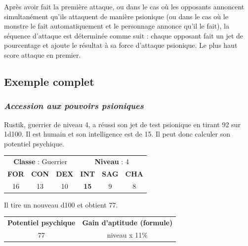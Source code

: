 \documentclass[11pt]{article}
\begin{document}
{\medskip

Après avoir fait la première attaque, ou dans le cas où les opposants annoncent simultanément qu'ils attaquent de manière psionique (ou dans le cas où le monstre le fait automatiquement et le personnage annonce qu'il le fait), la séquence d'attaque est déterminée comme suit : chaque opposant fait un jet de pourcentage et ajoute le résultat à sa force d'attaque psionique. Le plus haut score attaque en premier.











\newpage
\subsection*{Exemple complet}

\subsubsection*{\textit{Accession aux pouvoirs psioniques}}

Rustik, guerrier de niveau 4, a réussi son jet de test psionique en tirant 92 sur 1d100. Il est humain et son intelligence est de 15. Il peut donc calculer son potentiel psychique.

\bigskip

\begin{tabular}{cccccc}
\multicolumn{3}{c}{\textbf{Classe} : Guerrier} & \multicolumn{3}{c}{\textbf{Niveau} : 4} \\
\textbf{FOR} & \textbf{CON} & \textbf{DEX} & \textbf{INT} & \textbf{SAG} & \textbf{CHA} \\
16 & 13 & 10 & \textbf{15} & 9 & 8 \\
\end{tabular}

\bigskip

Il tire un nouveau d100 et obtient 77.

\bigskip

\begin{tabular}{cc}
\textbf{Potentiel psychique} & \textbf{Gain d'aptitude (formule)}\\
77 & niveau x 11\% \\
\end{tabular}

}
\end{document}
